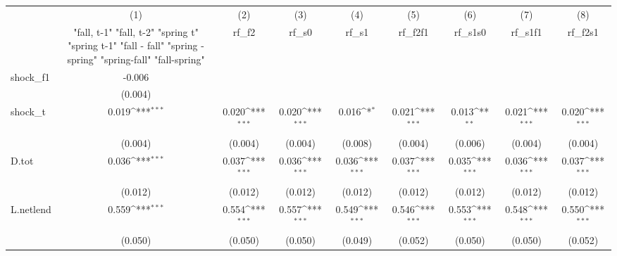 {
\def\sym#1{\ifmmode^{#1}\else\(^{#1}\)\fi}
\begin{tabular}{l*{8}{c}}
\toprule
            &\multicolumn{1}{c}{(1)}&\multicolumn{1}{c}{(2)}&\multicolumn{1}{c}{(3)}&\multicolumn{1}{c}{(4)}&\multicolumn{1}{c}{(5)}&\multicolumn{1}{c}{(6)}&\multicolumn{1}{c}{(7)}&\multicolumn{1}{c}{(8)}\\
            &\multicolumn{1}{c}{  "fall, t-1" "fall, t-2" "spring t" "spring t-1"  "fall - fall" "spring - spring" "spring-fall" "fall-spring" }&\multicolumn{1}{c}{rf\_f2}&\multicolumn{1}{c}{rf\_s0}&\multicolumn{1}{c}{rf\_s1}&\multicolumn{1}{c}{rf\_f2f1}&\multicolumn{1}{c}{rf\_s1s0}&\multicolumn{1}{c}{rf\_s1f1}&\multicolumn{1}{c}{rf\_f2s1}\\
\midrule
shock\_f1    &      -0.006         &                     &                     &                     &                     &                     &                     &                     \\
            &     (0.004)         &                     &                     &                     &                     &                     &                     &                     \\
\addlinespace
shock\_t     &       0.019\sym{***}&       0.020\sym{***}&       0.020\sym{***}&       0.016\sym{*}  &       0.021\sym{***}&       0.013\sym{**} &       0.021\sym{***}&       0.020\sym{***}\\
            &     (0.004)         &     (0.004)         &     (0.004)         &     (0.008)         &     (0.004)         &     (0.006)         &     (0.004)         &     (0.004)         \\
\addlinespace
D.tot       &       0.036\sym{***}&       0.037\sym{***}&       0.036\sym{***}&       0.036\sym{***}&       0.037\sym{***}&       0.035\sym{***}&       0.036\sym{***}&       0.037\sym{***}\\
            &     (0.012)         &     (0.012)         &     (0.012)         &     (0.012)         &     (0.012)         &     (0.012)         &     (0.012)         &     (0.012)         \\
\addlinespace
L.netlend   &       0.559\sym{***}&       0.554\sym{***}&       0.557\sym{***}&       0.549\sym{***}&       0.546\sym{***}&       0.553\sym{***}&       0.548\sym{***}&       0.550\sym{***}\\
            &     (0.050)         &     (0.050)         &     (0.050)         &     (0.049)         &     (0.052)         &     (0.050)         &     (0.050)         &     (0.052)         \\

\end{tabular}}
